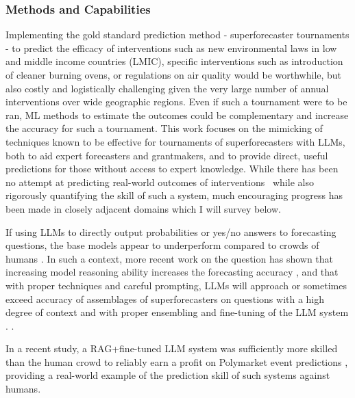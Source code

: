 \documentclass[12pt,a4paper]{article}
\begin{document}
\subsubsection{Methods and Capabilities}
Implementing the gold standard prediction method - superforecaster tournaments - to predict the efficacy of interventions such as new environmental laws in low and middle income countries (LMIC), specific interventions such as introduction of cleaner burning ovens, or regulations on air quality would be worthwhile, but also costly and logistically challenging given the very large number of annual interventions over wide geographic regions. Even if such a tournament were to be ran, ML methods to estimate the outcomes could be complementary and increase the accuracy for such a tournament. This work focuses on the mimicking of techniques known to be effective for tournaments of superforecasters with LLMs, both to aid expert forecasters and grantmakers, and to provide direct, useful predictions for those without access to expert knowledge. While there has been no attempt at predicting real-world outcomes of interventions \ABSTRACT\ while also rigorously quantifying the skill of such a system, much encouraging progress has been made in closely adjacent domains which I will survey below.

If using LLMs to directly output probabilities or yes/no answers to forecasting questions, the base models appear to underperform compared to crowds of humans  . In such a context, more recent work on the question has shown that increasing model reasoning ability increases the forecasting accuracy , and that with proper techniques and careful prompting, LLMs will approach or sometimes exceed accuracy of assemblages of superforecasters on questions with a high degree of context and with proper ensembling and fine-tuning of the LLM system .   . 

In a recent study, a RAG+fine-tuned LLM system was sufficiently more skilled than the human crowd to reliably earn a profit on Polymarket event predictions , providing a real-world example of the prediction skill of such systems against humans.
\end{document}
